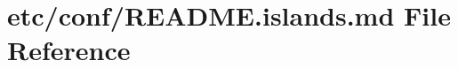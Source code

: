 \hypertarget{README_8islands_8md}{}\section{etc/conf/\+R\+E\+A\+D\+ME.islands.\+md File Reference}
\label{README_8islands_8md}
